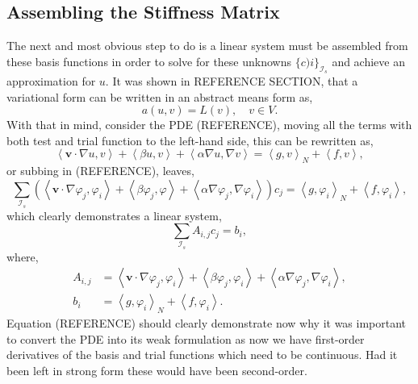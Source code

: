 \subsection{Assembling the Stiffness Matrix}

The next and most obvious step to do is a linear system must be assembled from these basis functions in order to solve for these unknowns $\{c)i\}_{\mathcal{I}_s}$ and achieve an approximation for $u$. It was shown in REFERENCE SECTION, that a variational form can be written in an abstract means form as,
\begin{equation}
	a(u,v) = L(v),\quad v\in V.
\end{equation}
With that in mind, consider the PDE (REFERENCE), moving all the terms with both test and trial function to the left-hand side, this can be rewritten as,
\begin{equation}
	\left\langle\mathbf{v}\cdot\nabla u,v\right\rangle + \left\langle\beta u,v\right\rangle + \left\langle\alpha\nabla u, \nabla v\right\rangle = \left\langle g,v\right\rangle_N + \left\langle f,v\right\rangle,
\end{equation}
or subbing in (REFERENCE), leaves,
\begin{equation}
	\sum_{\mathcal{I}_s}\left(\left\langle\mathbf{v}\cdot\nabla \varphi_j,\varphi_i\right\rangle + \left\langle\beta \varphi_j,\varphi\right\rangle + \left\langle\alpha\nabla \varphi_j, \nabla \varphi_i\right\rangle\right)c_j = \left\langle g,\varphi_i\right\rangle_N + \left\langle f,\varphi_i\right\rangle,
\end{equation}
which clearly demonstrates a linear system,
\begin{equation}
	\sum_{\mathcal{I}_s} A_{i,j}c_j = b_i,
\end{equation}
where,
\begin{align}
	A_{i,j} &= \left\langle\mathbf{v}\cdot\nabla \varphi_j,\varphi_i\right\rangle + \left\langle\beta \varphi_j,\varphi_i\right\rangle + \left\langle\alpha\nabla \varphi_j, \nabla \varphi_i\right\rangle,\\
	b_i &= \left\langle g,\varphi_i\right\rangle_N + \left\langle f,\varphi_i\right\rangle.
\end{align}
Equation (REFERENCE) should clearly demonstrate now why it was important to convert the PDE into its weak formulation as now we have first-order derivatives of the basis and trial functions which need to be continuous. Had it been left in strong form these would have been second-order.

